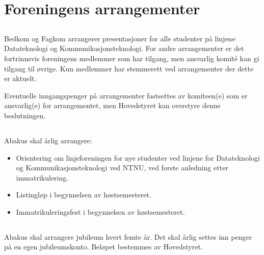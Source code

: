 \section{Foreningens arrangementer}

\subsection{}
Bedkom og Fagkom arrangerer presentasjoner for alle studenter på
linjene Datateknologi og Kommunikasjonsteknologi. For andre arrangementer er
det fortrinnsvis foreningens medlemmer som har tilgang, men ansvarlig komité
kan gi tilgang til øvrige. Kun medlemmer har stemmerett ved arrangementer der
dette er aktuelt.

Eventuelle inngangspenger på arrangementer fastsettes av komiteen(e) som er
ansvarlig(e) for arrangementet, men Hovedstyret kan overstyre denne
beslutningen.

\subsection{}
Abakus skal årlig arrangere:

\begin{itemize}
  \item Orientering om linjeforeningen for nye studenter ved linjene for
        Datateknologi og Kommunikasjonsteknologi ved NTNU, ved første anledning etter immatrikulering.
  \item Listingløp i begynnelsen av høstsemesteret.
  \item Immatrikuleringsfest i begynnelsen av høstsemesteret.
\end{itemize}

\subsection{}
Abakus skal arrangere jubileum hvert femte år. Det skal årlig settes inn penger
på en egen jubileumskonto. Beløpet bestemmes av Hovedstyret.
